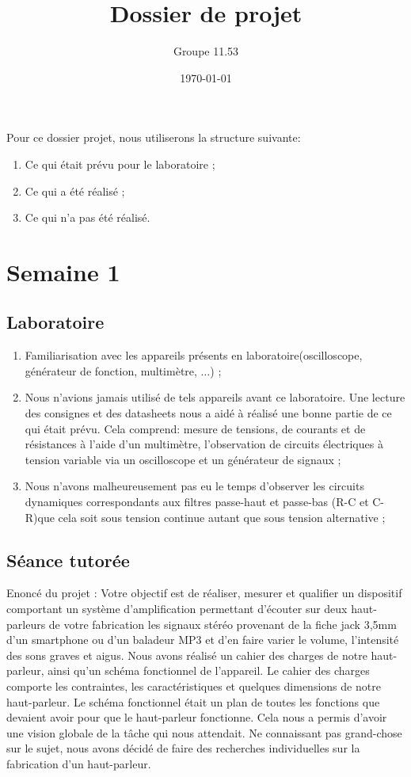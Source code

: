 \documentclass{article}
\title{Dossier de projet}
\author{Groupe 11.53}
\date{\today}
\begin{document}
\maketitle

Pour ce dossier projet, nous utiliserons la structure suivante:
\begin{enumerate}
\item Ce qui était prévu pour le laboratoire ;
\item Ce qui a été réalisé ;
\item Ce qui n'a pas été réalisé.
\end{enumerate}

\section{Semaine 1}
\subsection{Laboratoire}
\begin{enumerate}
	\item Familiarisation avec les appareils présents en laboratoire(oscilloscope, générateur de fonction, multimètre, $\dots$) ;
	\item Nous n'avions jamais utilisé de tels appareils avant ce laboratoire. Une lecture des consignes et des datasheets nous
				a aidé à réalisé une bonne partie de ce qui était prévu. Cela comprend: mesure de tensions, de courants et de résistances
				à l'aide d'un multimètre, l'observation de circuits électriques à tension variable via un oscilloscope et un générateur de signaux ;
	\item Nous n'avons malheureusement pas eu le temps d'observer les circuits dynamiques correspondants aux filtres passe-haut et passe-bas 
				(R-C et C-R)que cela soit sous tension continue autant que sous tension alternative ;
\end{enumerate}

\subsection{Séance tutorée}
Enoncé du projet : Votre objectif est de réaliser, mesurer et qualifier un dispositif comportant un système d’amplification permettant d’écouter sur deux haut-parleurs de votre fabrication les signaux stéréo provenant de la fiche jack 3,5mm d’un smartphone ou d’un baladeur MP3 et d’en faire varier le volume, l’intensité des sons graves et aigus.
Nous avons réalisé un cahier des charges de notre haut-parleur, ainsi qu’un schéma fonctionnel de l’appareil.  Le cahier des charges comporte les contraintes, les caractéristiques et quelques dimensions de notre haut-parleur.  Le schéma fonctionnel était un plan de toutes les fonctions que devaient avoir pour que le haut-parleur fonctionne.  Cela nous a permis d’avoir une vision globale de la tâche qui nous attendait. Ne connaissant pas grand-chose sur le sujet, nous avons décidé de faire des recherches individuelles sur la fabrication d’un haut-parleur. 
\end{document}
